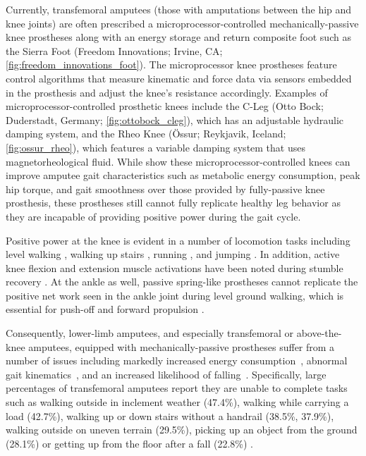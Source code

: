 Currently, transfemoral amputees (those with amputations between the hip and
knee joints) are often prescribed a microprocessor-controlled
mechanically-passive knee prostheses along with an energy storage and return
composite foot such as the Sierra Foot (Freedom Innovations;
Irvine, CA; \cref{fig:freedom_innovations_foot}). The microprocessor knee
prostheses feature control algorithms that measure kinematic and force data via
sensors embedded in the prosthesis and adjust the knee's resistance accordingly.
Examples of microprocessor-controlled prosthetic knees include the C-Leg (Otto
Bock; Duderstadt, Germany; \cref{fig:ottobock_cleg}), which has an adjustable
hydraulic damping system, and the Rheo Knee (Össur; Reykjavik, Iceland;
\cref{fig:ossur_rheo}), which features a variable damping system that uses
magnetorheological fluid. While \citet{johansson2005clinical} show these
microprocessor-controlled knees can improve amputee gait characteristics such as
metabolic energy consumption, peak hip torque, and gait smoothness over those
provided by fully-passive knee prosthesis, these prostheses still cannot fully
replicate healthy leg behavior as they are incapable of providing positive power
during the gait cycle. 

Positive power at the knee is evident in a number of locomotion tasks including
level walking \citep{perry1992gait}, walking up stairs
\citep{nadeau2003frontal}, running \citep{buczek1990stance}, and jumping
\citep{hubley1983work}. In addition, active knee flexion and extension muscle
activations have been noted during stumble recovery \citep{eng1994strategies}.
At the ankle as well, passive spring-like prostheses cannot replicate the
positive net work seen in the ankle joint during level ground walking, which is
essential for push-off and forward propulsion \citep{perry1992gait}.


Consequently, lower-limb amputees, and especially transfemoral or above-the-knee
amputees, equipped with mechanically-passive prostheses suffer from a number of
issues including markedly increased energy consumption~\citep{waters1976energy},
abnormal gait kinematics~\citep{jaegers1995prosthetic}, and an increased
likelihood of falling~\citep{miller2001prevalence}. Specifically, large
percentages of transfemoral amputees report they are unable to complete tasks
such as walking outside in inclement weather (47.4\%), walking while carrying a
load (42.7\%), walking up or down stairs without a handrail (38.5\%, 37.9\%),
walking outside on uneven terrain (29.5\%), picking up an object from the ground
(28.1\%) or getting up from the floor after a fall (22.8\%)
\citep{gauthier1999enabling}.

